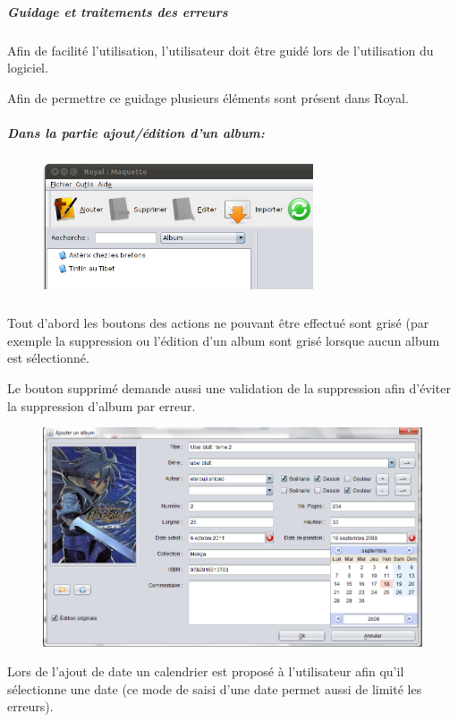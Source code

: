 \documentclass[etudiants]{support-iutrs}
\begin{document}
\subparagraph{Guidage et traitements des erreurs} 
Afin de facilité l'utilisation, l'utilisateur doit être guidé lors de l'utilisation du logiciel.

Afin de permettre ce guidage plusieurs éléments sont présent dans Royal.

\subparagraph{Dans la partie ajout/édition d'un album:}
\subparagraph{}

\begin{figure}
\includegraphics[width=8cm]{img/app_pc_maquette_btn_grise.png}
\end{figure}\subparagraph{}

Tout d'abord les boutons des actions ne pouvant être effectué sont grisé (par exemple la suppression ou l’édition d'un album sont grisé lorsque aucun album est sélectionné.

Le bouton supprimé demande aussi une validation de la suppression afin d'éviter la suppression d'album par erreur.
\clearpage

\begin{figure}[h!]
\begin{center}
\includegraphics[width=12cm]{img/app_pc_maquette_ajout_album.png}
\end{center}
\end{figure}
Lors de l'ajout de date un calendrier est proposé à l'utilisateur afin qu’il sélectionne une date (ce mode de saisi d'une date permet aussi de limité les erreurs).
\end{document}
